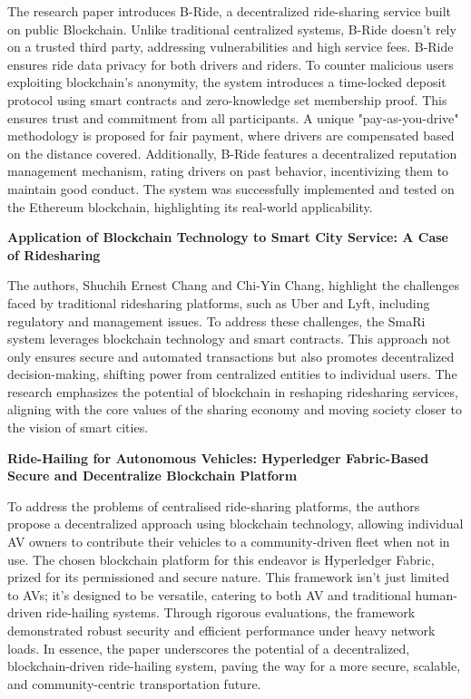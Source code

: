 The research paper introduces B-Ride, a decentralized ride-sharing service built on public Blockchain. Unlike traditional centralized systems, B-Ride doesn't rely on a trusted third party, addressing vulnerabilities and high service fees. B-Ride ensures ride data privacy for both drivers and riders. To counter malicious users exploiting blockchain's anonymity, the system introduces a time-locked deposit protocol using smart contracts and zero-knowledge set membership proof. This ensures trust and commitment from all participants. A unique "pay-as-you-drive" methodology is proposed for fair payment, where drivers are compensated based on the distance covered. Additionally, B-Ride features a decentralized reputation management mechanism, rating drivers on past behavior, incentivizing them to maintain good conduct. The system was successfully implemented and tested on the Ethereum blockchain, highlighting its real-world applicability.

\textbf{Application of Blockchain Technology to Smart City Service: A Case of Ridesharing}

The authors, Shuchih Ernest Chang and Chi-Yin Chang, highlight the challenges faced by traditional ridesharing platforms, such as Uber and Lyft, including regulatory and management issues. To address these challenges, the SmaRi system leverages blockchain technology and smart contracts. This approach not only ensures secure and automated transactions but also promotes decentralized decision-making, shifting power from centralized entities to individual users. The research emphasizes the potential of blockchain in reshaping ridesharing services, aligning with the core values of the sharing economy and moving society closer to the vision of smart cities.

\textbf{Ride-Hailing for Autonomous Vehicles: Hyperledger Fabric-Based Secure and Decentralize Blockchain Platform}

To address the problems of centralised ride-sharing platforms, the authors propose a decentralized approach using blockchain technology, allowing individual AV owners to contribute their vehicles to a community-driven fleet when not in use. The chosen blockchain platform for this endeavor is Hyperledger Fabric, prized for its permissioned and secure nature. This framework isn't just limited to AVs; it's designed to be versatile, catering to both AV and traditional human-driven ride-hailing systems. Through rigorous evaluations, the framework demonstrated robust security and efficient performance under heavy network loads. In essence, the paper underscores the potential of a decentralized, blockchain-driven ride-hailing system, paving the way for a more secure, scalable, and community-centric transportation future.

